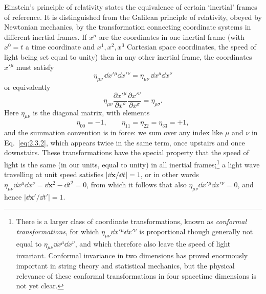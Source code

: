Einstein's principle of relativity states the equivalence of certain
`inertial' frames of reference. It is distinguished from the Galilean
principle of relativity, obeyed by Newtonian mechanics, by the
transformation connecting coordinate systems in different inertial frames.
If $x^\mu$ are the coordinates in one inertial frame (with $x^0=t$ a time
coordinate and $x^1,x^2,x^3$ Cartesian space coordinates, the speed of
light being set equal to unity) then in any other inertial frame, the
coordinates $x'{}^\mu$ must satisfy
\begin{equation}
  \eta_{\mu\nu}\,\dd x'{}^\mu \dd x'{}^\nu
    =\eta_{\mu\nu}\,\dd x^\mu \dd x^\nu
  \tag{2.3.1}\label{eq:2.3.1}
\end{equation}
or equivalently
\begin{equation}
  \eta_{\mu\nu}
    \frac{\partial x'{}^\mu}{\partial x^\rho}
    \frac{\partial x'{}^\nu}{\partial x^\sigma}
    =\eta_{\rho\sigma}.
  \tag{2.3.2}\label{eq:2.3.2}
\end{equation}
Here $\eta_{\mu\nu}$ is the diagonal matrix, with elements
\begin{equation}
  \eta_{00}=-1,
  \qquad \eta_{11}=\eta_{22}=\eta_{33}=+1,
  \tag{2.3.3}\label{eq:2.3.3}
\end{equation}
and the summation convention is in force: we sum over any index like
$\mu$ and $\nu$ in Eq.~\eqref{eq:2.3.2}, which appears twice in the same term, once
upstairs and once downstairs. These transformations have the special
property that the speed of light is the same (in our units, equal to unity)
in all inertial frames;\footnote{There is a larger class of coordinate
transformations, known as \emph{conformal transformations}, for which
$\eta_{\mu\nu}\dd x'{}^\mu \dd x'{}^\nu$ is proportional though generally not
equal to $\eta_{\mu\nu}\dd x^\mu \dd x^\nu$, and which therefore also leave the
speed of light invariant. Conformal invariance in two dimensions has
proved enormously important in string theory and statistical mechanics,
but the physical relevance of these conformal transformations in four
spacetime dimensions is not yet clear.}
a light wave travelling at unit
speed satisfies $|\dd\mathbf{x}/\dd t|=1$, or in other words
$\eta_{\mu\nu}\dd x^\mu \dd x^\nu=\dd\mathbf{x}^2-\dd t^2=0$, from which it follows
that also $\eta_{\mu\nu}\dd x'{}^\mu \dd x'{}^\nu=0$, and hence
$|\dd\mathbf{x}'/\dd t'|=1$.

